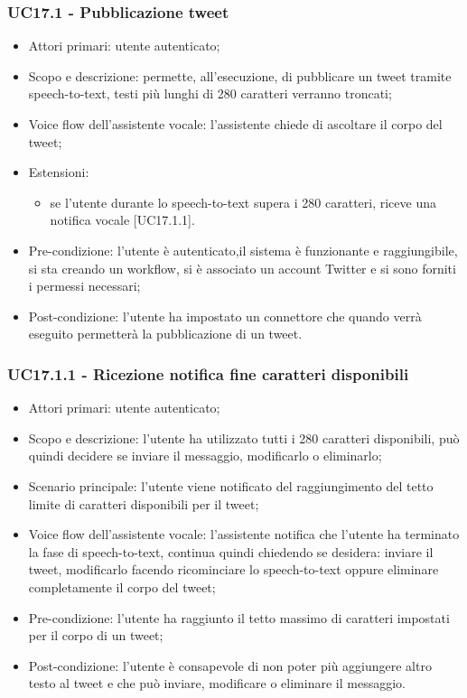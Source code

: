 \subsubsection{UC17.1 - Pubblicazione tweet}
\begin{itemize}
	\item  Attori primari: utente autenticato;
	\item  Scopo e descrizione: permette, all'esecuzione, di pubblicare un tweet tramite speech-to-text, testi più lunghi di 280 caratteri verranno troncati;
	\item  Voice flow dell'assistente vocale: l'assistente chiede di ascoltare il corpo del tweet;
	\item  Estensioni: 
		   \begin{itemize}
				\item se l'utente durante lo speech-to-text supera i 280 caratteri, riceve una notifica vocale [UC17.1.1].
		   \end{itemize}
	\item  Pre-condizione: l'utente è autenticato,il sistema è funzionante e raggiungibile, si sta creando un workflow, si è associato un account Twitter e si sono forniti i permessi necessari;
	\item  Post-condizione: l'utente ha impostato un connettore che quando verrà eseguito permetterà la pubblicazione di un tweet.
\end{itemize}
\subsubsection{UC17.1.1 - Ricezione notifica fine caratteri disponibili}
\begin{itemize}
	\item  Attori primari: utente autenticato;
	\item  Scopo e descrizione: l'utente ha utilizzato tutti i 280 caratteri disponibili, può quindi decidere se inviare il messaggio, modificarlo o eliminarlo;
	\item  Scenario principale: l'utente viene notificato del raggiungimento del tetto limite di caratteri disponibili per il tweet;
	\item  Voice flow dell'assistente vocale: l'assistente notifica che l'utente ha terminato la fase di speech-to-text, continua quindi chiedendo se desidera: inviare il tweet, modificarlo facendo ricominciare lo speech-to-text oppure eliminare completamente il corpo del tweet;
	\item  Pre-condizione: l'utente ha raggiunto il tetto massimo di caratteri impostati per il corpo di un tweet;
	\item  Post-condizione: l'utente è consapevole di non poter più aggiungere altro testo al tweet e che può inviare, modificare o eliminare il messaggio.
\end{itemize}
